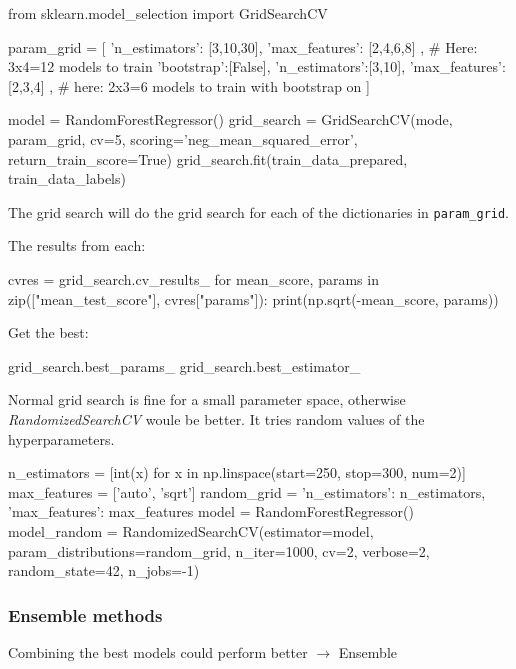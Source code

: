     \begin{python}
        from sklearn.model_selection import GridSearchCV

        param_grid = [
            {'n_estimators': [3,10,30],
             'max_features': [2,4,6,8]
            },      # Here: 3x4=12 models to train
            {'bootstrap':[False],
             'n_estimators':[3,10],
             'max_features':[2,3,4]
            },      # here: 2x3=6 models to train with bootstrap on
        ]

        model = RandomForestRegressor()
        grid_search = GridSearchCV(mode, param_grid, cv=5,
                        scoring='neg_mean_squared_error',
                        return_train_score=True)
        grid_search.fit(train_data_prepared, train_data_labels)
    \end{python}
    The grid search will do the grid search for each of the dictionaries in \verb;param_grid;.

    The results from each:
    \begin{python}
        cvres = grid_search.cv_results_
        for mean_score, params in zip(["mean_test_score"], cvres["params"]):
            print(np.sqrt(-mean_score, params))
    \end{python}

    Get the best:
    \begin{python}
        grid_search.best_params_
        grid_search.best_estimator_
    \end{python}

    Normal grid search is fine for a small parameter space, otherwise \emph{RandomizedSearchCV} woule be better.
    It tries random values of the hyperparameters.
    \begin{python}
        n_estimators = [int(x) for x in np.linspace(start=250, stop=300, num=2)]
        max_features = ['auto', 'sqrt']
        random_grid = {'n_estimators': n_estimators,
                       'max_features': max_features}
        model = RandomForestRegressor()
        model_random = RandomizedSearchCV(estimator=model,
                                    param_distributions=random_grid,
                                    n_iter=1000, cv=2, verbose=2,
                                    random_state=42, n_jobs=-1)
    \end{python}

    \subsubsection*{Ensemble methods}
    Combining the best models could perform better $\rightarrow$ Ensemble

